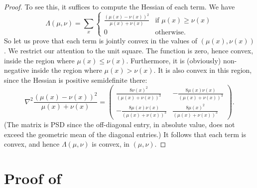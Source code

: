 \documentclass[11pt,letterpaper]{article}
\renewcommand{\geq}{\geqslant}
\renewcommand{\leq}{\leqslant}
\renewcommand{\le}{\leq}
\renewcommand{\ge}{\geq}
\theoremstyle{definition}
\begin{document}
\begin{proof}
To see this, it suffices to compute the Hessian of each term.
We have
\[
\Lambda(\mu,\nu) = \sum_{x} \begin{cases}
\frac{(\mu(x)-\nu(x))^2}{\mu(x)+\nu(x)} & \text{if } \mu(x) \ge \nu(x)\\
0 & \text{otherwise}.
\end{cases}
\]
So let us prove that each term is jointly convex in the values of $(\mu(x), \nu(x))$. We restrict our attention to the unit square. The function is zero, hence convex, inside the region where $\mu(x) \le \nu(x)$. Furthermore, it is (obviously) non-negative inside the region where $\mu(x) > \nu(x)$. It is also convex in this region, since the Hessian is positive semidefinite there:
 \[
 \nabla^2 \frac{(\mu(x) - \nu(x))^2}{\mu(x)+\nu(x)}  =
\begin{pmatrix}
 \frac{8 \nu(x)^2}{(\mu(x) +\nu(x) )^3} & -\frac{8 \mu(x)  \nu(x) }{(\mu(x) +\nu(x) )^3} \\
 -\frac{8 \mu(x)  \nu(x) }{(\mu(x) +\nu(x) )^3} & \frac{8 \mu(x)^2}{(\mu(x) +\nu(x) )^3}
\end{pmatrix}.
\]
(The matrix is PSD since the off-diagonal entry, in absolute value, does not exceed the geometric mean of the diagonal entries.) It follows that each term is convex, and hence $\Lambda(\mu,\nu)$ is convex, in $(\mu,\nu)$.
\end{proof}



\section{Proof of \texorpdfstring{}{Claim}} \label{sec:proof-direct-sum}
\end{document}
